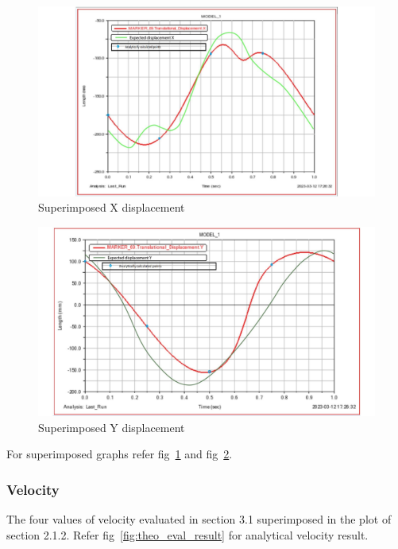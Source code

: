             \begin{figure}[hbt!]
                \centering
                \includegraphics[width=0.9\columnwidth]{Images/anal_x_disp.jpg}
                \caption{Superimposed X displacement}
                \label{fig:anal_x_disp}
            \end{figure}

            \begin{figure}[hbt!]
                \centering
                \includegraphics[width=0.9\columnwidth]{Images/anal_height_variation.jpg}
                \caption{Superimposed Y displacement}
                \label{fig:anal_y_disp}
            \end{figure}

            For superimposed graphs refer fig~\ref{fig:anal_x_disp} and fig~\ref{fig:anal_y_disp}.

        \subsubsection{Velocity}
            The four values of velocity evaluated in section 3.1 superimposed in the plot of section 2.1.2. Refer fig~\ref{fig:theo_eval_result} for analytical velocity result.

